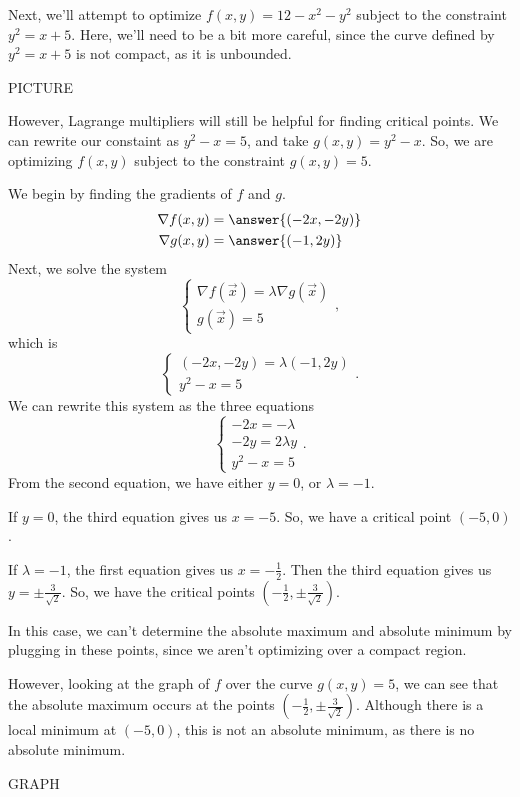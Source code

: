 \documentclass{ximera}
\begin{document}
\begin{example}
Next, we'll attempt to optimize $f(x,y) = 12-x^2-y^2$ subject to the constraint $y^2=x+5$. Here, we'll need to be a bit more careful, since the curve defined by $y^2=x+5$ is not compact, as it is unbounded. 

PICTURE

However, Lagrange multipliers will still be helpful for finding critical points. We can rewrite our constaint as $y^2-x=5$, and take $g(x,y) = y^2-x$. So, we are optimizing $f(x,y)$ subject to the constraint $g(x,y) = 5$.

We begin by finding the gradients of $f$ and $g$.
\begin{align*}
\nabla f(x,y) &= \answer{(-2x, -2y)}\\
\nabla g(x,y) &= \answer{(-1, 2y)}
\end{align*}
Next, we solve the system
\[\begin{cases}
\nabla f(\vec{x}) = \lambda \nabla g(\vec{x})\\
g(\vec{x}) = 5
\end{cases}, \]
which is
\[\begin{cases}
(-2x,-2y) = \lambda (-1,2y)\\
y^2-x= 5
\end{cases}. \]
We can rewrite this system as the three equations
\[\begin{cases}
-2x = -\lambda\\
-2y = 2\lambda y\\
y^2-x= 5
\end{cases}. \]
From the second equation, we have either $y=0$, or $\lambda =-1$.

If $y=0$, the third equation gives us $x=-5$. So, we have a critical point $(-5,0)$.

If $\lambda =-1$, the first equation gives us $x= -\frac{1}{2}$. Then the third equation gives us $y=\pm\frac{3}{\sqrt{2}}$. So, we have the critical points $\left(-\frac{1}{2}, \pm\frac{3}{\sqrt{2}}\right)$.

In this case, we can't determine the absolute maximum and absolute minimum by plugging in these points, since we aren't optimizing over a compact region.

However, looking at the graph of $f$ over the curve $g(x,y) = 5$, we can see that the absolute maximum occurs at the points $\left(-\frac{1}{2}, \pm\frac{3}{\sqrt{2}}\right)$. Although there is a local minimum at $(-5,0)$, this is not an absolute minimum, as there is no absolute minimum.

GRAPH

\end{example}
\end{document}
